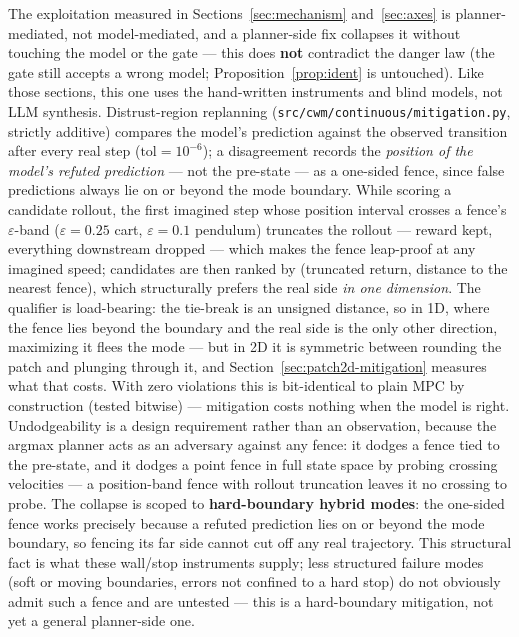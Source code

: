 \documentclass[11pt]{article}
\theoremstyle{definition}
\theoremstyle{remark}
\begin{document}
The exploitation measured in Sections~\ref{sec:mechanism} and~\ref{sec:axes} is planner-mediated, not model-mediated, and a planner-side fix collapses it without touching the model or the gate --- this does \textbf{not} contradict the danger law (the gate still accepts a wrong model; Proposition~\ref{prop:ident} is untouched). Like those sections, this one uses the hand-written instruments and blind models, not LLM synthesis. Distrust-region replanning (\texttt{src/cwm/continuous/mitigation.py}, strictly additive) compares the model's prediction against the observed transition after every real step ($\mathrm{tol} = 10^{-6}$); a disagreement records the \emph{position of the model's refuted prediction} --- not the pre-state --- as a one-sided fence, since false predictions always lie on or beyond the mode boundary. While scoring a candidate rollout, the first imagined step whose position interval crosses a fence's $\varepsilon$-band ($\varepsilon = 0.25$ cart, $\varepsilon = 0.1$ pendulum) truncates the rollout --- reward kept, everything downstream dropped --- which makes the fence leap-proof at any imagined speed; candidates are then ranked by (truncated return, distance to the nearest fence), which structurally prefers the real side \emph{in one dimension}. The qualifier is load-bearing: the tie-break is an unsigned distance, so in 1D, where the fence lies beyond the boundary and the real side is the only other direction, maximizing it flees the mode --- but in 2D it is symmetric between rounding the patch and plunging through it, and Section~\ref{sec:patch2d-mitigation} measures what that costs. With zero violations this is bit-identical to plain MPC by construction (tested bitwise) --- mitigation costs nothing when the model is right. Undodgeability is a design requirement rather than an observation, because the argmax planner acts as an adversary against any fence: it dodges a fence tied to the pre-state, and it dodges a point fence in full state space by probing crossing velocities --- a position-band fence with rollout truncation leaves it no crossing to probe. The collapse is scoped to \textbf{hard-boundary hybrid modes}: the one-sided fence works precisely because a refuted prediction lies on or beyond the mode boundary, so fencing its far side cannot cut off any real trajectory. This structural fact is what these wall/stop instruments supply; less structured failure modes (soft or moving boundaries, errors not confined to a hard stop) do not obviously admit such a fence and are untested --- this is a hard-boundary mitigation, not yet a general planner-side one.
\end{document}
